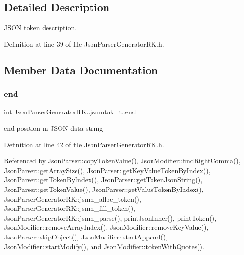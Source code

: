 \subsection{Detailed Description}
J\+S\+ON token description. 

Definition at line 39 of file Json\+Parser\+Generator\+R\+K.\+h.



\subsection{Member Data Documentation}
\mbox{\label{struct_json_parser_generator_r_k_1_1jsmntok__t_a7bd5d158fd8e6c1be21ab29994ef6bef}} 
\subsubsection{\texorpdfstring{end}{end}}
{\footnotesize\ttfamily int Json\+Parser\+Generator\+R\+K\+::jsmntok\+\_\+t\+::end}



end position in J\+S\+ON data string 



Definition at line 42 of file Json\+Parser\+Generator\+R\+K.\+h.



Referenced by Json\+Parser\+::copy\+Token\+Value(), Json\+Modifier\+::find\+Right\+Comma(), Json\+Parser\+::get\+Array\+Size(), Json\+Parser\+::get\+Key\+Value\+Token\+By\+Index(), Json\+Parser\+::get\+Token\+By\+Index(), Json\+Parser\+::get\+Token\+Json\+String(), Json\+Parser\+::get\+Token\+Value(), Json\+Parser\+::get\+Value\+Token\+By\+Index(), Json\+Parser\+Generator\+R\+K\+::jsmn\+\_\+alloc\+\_\+token(), Json\+Parser\+Generator\+R\+K\+::jsmn\+\_\+fill\+\_\+token(), Json\+Parser\+Generator\+R\+K\+::jsmn\+\_\+parse(), print\+Json\+Inner(), print\+Token(), Json\+Modifier\+::remove\+Array\+Index(), Json\+Modifier\+::remove\+Key\+Value(), Json\+Parser\+::skip\+Object(), Json\+Modifier\+::start\+Append(), Json\+Modifier\+::start\+Modify(), and Json\+Modifier\+::token\+With\+Quotes().

\mbox{\label{struct_json_parser_generator_r_k_1_1jsmntok__t_a4fe2f163e9a419ab974b88e95d9e6d9e}} 
